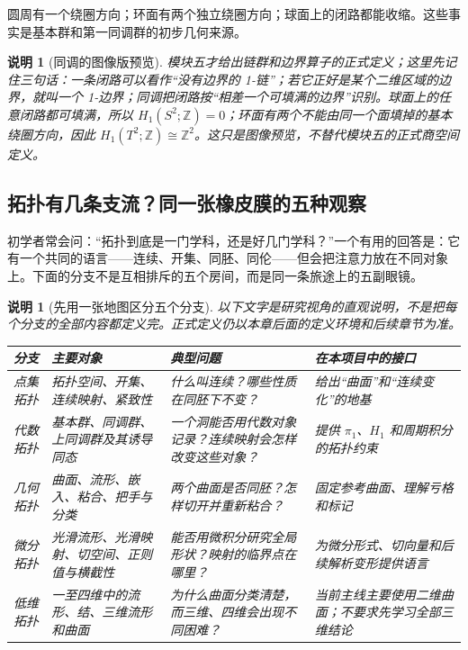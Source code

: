 \documentclass[UTF8,fontset=none,a4paper,11pt]{ctexart}
\theoremstyle{foundation-definition}
\theoremstyle{foundation-theorem}
\theoremstyle{foundation-proposition}
\theoremstyle{foundation-example}
\theoremstyle{foundation-remark}
\newtheorem{remark}[definition]{说明}
\theoremstyle{foundation-theorem}
\begin{document}
圆周有一个绕圈方向；环面有两个独立绕圈方向；球面上的闭路都能收缩。这些事实是基本群和第一同调群的初步几何来源。

\begin{remark}[同调的图像版预览]
模块五才给出链群和边界算子的正式定义；这里先记住三句话：一条闭路可以看作“没有边界的 1-链”；若它正好是某个二维区域的边界，就叫一个 1-边界；同调把闭路按“相差一个可填满的边界”识别。球面上的任意闭路都可填满，所以 \(H_1(S^2;\mathbb Z)=0\)；环面有两个不能由同一个面填掉的基本绕圈方向，因此 \(H_1(T^2;\mathbb Z)\cong\mathbb Z^2\)。这只是图像预览，不替代模块五的正式商空间定义。
\end{remark}

\subsection{拓扑有几条支流？同一张橡皮膜的五种观察}

初学者常会问：“拓扑到底是一门学科，还是好几门学科？”一个有用的回答是：它有一个共同的语言——连续、开集、同胚、同伦——但会把注意力放在不同对象上。下面的分支不是互相排斥的五个房间，而是同一条旅途上的五副眼镜。

\begin{remark}[先用一张地图区分五个分支]\label{rem:topology-branches}
以下文字是研究视角的直观说明，不是把每个分支的全部内容都定义完。正式定义仍以本章后面的定义环境和后续章节为准。
\begin{center}
{\small
\setlength{\tabcolsep}{3pt}
\begin{tabularx}{\textwidth}{p{}|p{}|p{}|X}
\toprule
分支 & 主要对象 & 典型问题 & 在本项目中的接口 \\
\midrule
点集拓扑 & 拓扑空间、开集、连续映射、紧致性 & 什么叫连续？哪些性质在同胚下不变？ & 给出“曲面”和“连续变化”的地基 \\
代数拓扑 & 基本群、同调群、上同调群及其诱导同态 & 一个洞能否用代数对象记录？连续映射会怎样改变这些对象？ & 提供 \(\pi_1\)、\(H_1\) 和周期积分的拓扑约束 \\
几何拓扑 & 曲面、流形、嵌入、粘合、把手与分类 & 两个曲面是否同胚？怎样切开并重新粘合？ & 固定参考曲面、理解亏格和标记 \\
微分拓扑 & 光滑流形、光滑映射、切空间、正则值与横截性 & 能否用微积分研究全局形状？映射的临界点在哪里？ & 为微分形式、切向量和后续解析变形提供语言 \\
低维拓扑 & 一至四维中的流形、结、三维流形和曲面 & 为什么曲面分类清楚，而三维、四维会出现不同困难？ & 当前主线主要使用二维曲面；不要求先学习全部三维结论 \\
\bottomrule
\end{tabularx}}
\end{center}
\end{remark}
\end{document}
